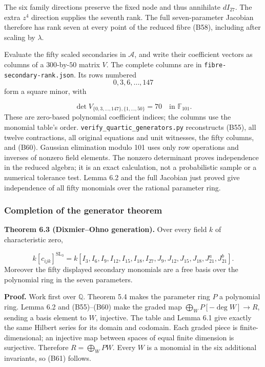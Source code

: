 \documentclass[
]{article}
\begin{document}
The six family directions preserve the fixed node and thus annihilate
\(dI_{27}\). The extra \(z^4\) direction supplies the seventh rank. The
full seven-parameter Jacobian therefore has rank seven at every point of
the reduced fibre (B58), including after scaling by \(\lambda\).

Evaluate the fifty scaled secondaries in \(\mathcal A\), and write their
coefficient vectors as columns of a \(300\)-by-\(50\) matrix \(V\). The
complete columns are in \texttt{fibre-secondary-rank.json}. Its rows
numbered \[
0,3,6,\ldots,147
\] form a square minor, with
\protect{}\label{equation-B60}{}

\[
\det V_{\{0,3,\ldots,147\},\{1,\ldots,50\}}=70\quad\text{in }\mathbb F_{101}.
\tag{B60}
\] These are zero-based polynomial coefficient indices; the columns use
the monomial table's order. \texttt{verify\_quartic\_generators.py}
reconstructs (B55), all twelve contractions, all original equations and
unit witnesses, the fifty columns, and (B60). Gaussian elimination
modulo 101 uses only row operations and inverses of nonzero field
elements. The nonzero determinant proves independence in the reduced
algebra; it is an exact calculation, not a probabilistic sample or a
numerical tolerance test. Lemma 6.2 and the full Jacobian just proved
give independence of all fifty monomials over the rational parameter
ring.

\subsubsection{Completion of the generator
theorem}\label{completion-of-the-generator-theorem}

\protect{}\label{theorem-6-3}{}

\textbf{Theorem 6.3 (Dixmier--Ohno generation).} Over every field \(k\)
of characteristic zero, \protect{}\label{equation-B61}{}

\[
k [c_{ijk}]^{\operatorname{SL}_3}=
k [I_3,I_6,I_9,I_{12},I_{15},I_{18},I_{27},
J_9,J_{12},J_{15},J_{18},J_{21}^{a},J_{21}^{b}].
\tag{B61}
\] Moreover the fifty displayed secondary monomials are a free basis
over the polynomial ring in the seven parameters.

\textbf{Proof.} Work first over \(\mathbb Q\). Theorem 5.4 makes the
parameter ring \(P\) a polynomial ring. Lemma 6.2 and (B55)--(B60) make
the graded map \(\bigoplus_{W}P [-\deg W]\to R\), sending a basis
element to \(W\), injective. The table and Lemma 6.1 give exactly the
same Hilbert series for its domain and codomain. Each graded piece is
finite-dimensional; an injective map between spaces of equal finite
dimension is surjective. Therefore \(R=\bigoplus_W PW\). Every \(W\) is
a monomial in the six additional invariants, so (B61) follows.
\end{document}

